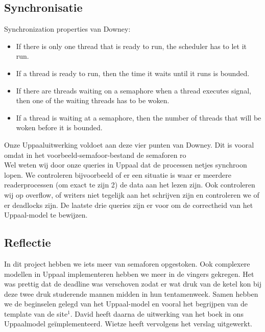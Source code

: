 \documentclass{article}
\begin{document}
\subsection*{Synchronisatie}
Synchronization properties van Downey:
\begin{itemize}
\item If there is only one thread that is ready to run, the scheduler has to let it run.
\item If a thread is ready to run, then the time it waits until it runs is bounded.
\item If there are threads waiting on a semaphore when a thread executes signal, then one of the waiting threads has to be woken.
\item If a thread is waiting at a semaphore, then the number of threads that will be woken before it is bounded.
\end{itemize}
Onze Uppaaluitwerking voldoet aan deze vier punten van Downey. Dit is vooral omdat in het voorbeeld-semafoor-bestand de semaforen ro\\
Wel weten wij door onze queries in Uppaal dat de processen netjes synchroon lopen. We controleren bijvoorbeeld of er een situatie is waar er meerdere readerprocessen (om exact te zijn 2) de data aan het lezen zijn. Ook controleren wij op overflow, of writers niet tegelijk aan het schrijven zijn en controleren we of er deadlocks zijn. De laatste drie queries zijn er voor om de correctheid van het Uppaal-model te bewijzen.

\subsection*{Reflectie}
In dit project hebben we iets meer van semaforen opgestoken. Ook complexere modellen in Uppaal implementeren hebben we meer in de vingers gekregen. Het was prettig dat de deadline was verschoven zodat er wat druk van de ketel kon bij deze twee druk studerende mannen midden in hun tentamenweek. Samen hebben we de beginselen gelegd van het Uppaal-model en vooral het begrijpen van de template van de site$^1$. David heeft daarna de uitwerking van het boek in ons Uppaalmodel ge\"implementeerd. Wietze heeft vervolgens het verslag uitgewerkt. 
\end{document}
